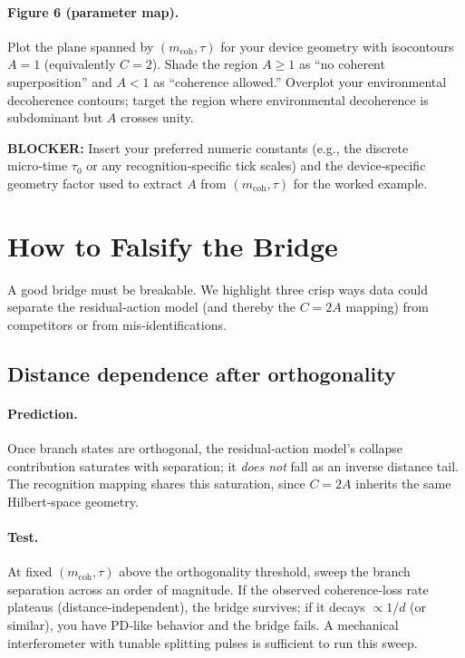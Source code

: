 \documentclass[11pt,letterpaper]{article}
\begin{document}
\paragraph{Figure 6 (parameter map).}
Plot the plane spanned by $(m_{\mathrm{coh}},\tau)$ for your device geometry with isocontours $A=1$ (equivalently $C=2$). Shade the region $A\ge 1$ as ``no coherent superposition'' and $A<1$ as ``coherence allowed.'' Overplot your environmental decoherence contours; target the region where environmental decoherence is subdominant but $A$ crosses unity. %

\noindent\textbf{BLOCKER:} Insert your preferred numeric constants (e.g., the discrete micro‑time $\tau_0$ or any recognition‑specific tick scales) and the device‑specific geometry factor used to extract $A$ from $(m_{\mathrm{coh}},\tau)$ for the worked example.

\section{How to Falsify the Bridge}
\label{sec:falsify}

A good bridge must be breakable. We highlight three crisp ways data could separate the residual‑action model (and thereby the $C=2A$ mapping) from competitors or from mis‑identifications.

\subsection{Distance dependence after orthogonality}

\paragraph{Prediction.}
Once branch states are orthogonal, the residual‑action model’s collapse contribution saturates with separation; it \emph{does not} fall as an inverse distance tail. The recognition mapping shares this saturation, since $C=2A$ inherits the same Hilbert‑space geometry. %

\paragraph{Test.}
At fixed $(m_{\mathrm{coh}},\tau)$ above the orthogonality threshold, sweep the branch separation across an order of magnitude. If the observed coherence‑loss rate plateaus (distance‑independent), the bridge survives; if it decays $\propto 1/d$ (or similar), you have PD‑like behavior and the bridge fails. A mechanical interferometer with tunable splitting pulses is sufficient to run this sweep.
\end{document}
